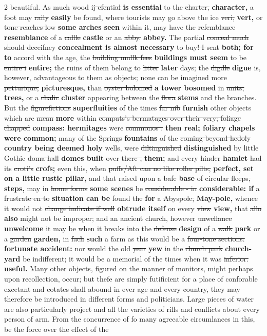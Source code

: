 \documentclass[10pt]{article}
\begin{document}
\begin{multicols}{2}
beautiful. As much wood \sout{ij efential} \textbf{is essential} to the \sout{charter,} \textbf{character,} a foot may \sout{raily} \textbf{easily} be found, where tourists may go above the ice \sout{veri,} \textbf{vert,} or \sout{tone reaches low} \textbf{some arches seen} within it, may have the \sout{refemblance} \textbf{resemblance} of a \sout{callle} \textbf{castle} or an \sout{abby.} \textbf{abbey.} The partial \sout{conceal much should deceifney} \textbf{concealment is almost necessary} to \sout{buy! I sent} \textbf{both; for to} accord with the age, the \sout{building mullk fees} \textbf{buildings must seem} to be \sout{entire i} \textbf{entire;} the ruins of them belong to \sout{litter} \textbf{later} days; the \sout{digdle} \textbf{digue} is, however, advantageous to them as objects; none can be imagined more \sout{petturique,} \textbf{picturesque,} than \sout{oyster bolomed} \textbf{a tower bosomed} in \sout{units,} \textbf{trees,} or a \sout{chalic} \textbf{cluster} appearing between the \sout{flora} \textbf{stems} and the branches. But the \sout{figurefictions} \textbf{superfluities} of the times \sout{far nib} \textbf{furnish} other objects which are \sout{mean} \textbf{more} within \sout{compats’s bermatages over their very; foliage chapped} \textbf{compass: hermitages} were \sout{commonos :} \textbf{then real; foliary chapels were common;} many of the \sout{Springs} \textbf{fountains} of the \sout{coming beyond hedoly} \textbf{country being deemed holy} wells, were \sout{diltinguished} \textbf{distinguished} by little Gothic \sout{doma hall} \textbf{domes built} over \sout{there ,} \textbf{them;} and every \sout{hinder} \textbf{hamlet} had its \sout{croti's} \textbf{crofs;} even this, when \sout{puffs/Aft can no like roller pilts,} \textbf{perfect, set on a little rustic pillar,} and that raised upon a \sout{bafe} \textbf{base} of circular \sout{fleeps,} \textbf{steps,} may in \sout{home forms} \textbf{some scenes} be \sout{considerable - in} \textbf{considerable: if} a \sout{frustrate en to} \textbf{situation can be} found \sout{the} \textbf{for} a \sout{Abyspole,} \textbf{May-pole,} whence it would not \sout{change indicate if well} \textbf{obtrude itself} on every \sout{view} \textbf{view,} that \sout{allo} \textbf{also} might not be improper; and an ancient church, however \sout{unwellance} \textbf{unwelcome} it may be when it breaks into the \sout{defense} \textbf{design} of a \sout{walk} \textbf{park} or a \sout{garden} \textbf{garden,} in \sout{fach} \textbf{such} a farm as this would be a \sout{four-tone sections:} \textbf{fortunate accident:} nor would the old \sout{year} \textbf{yew} in the \sout{church park} \textbf{church-yard} be indifferent; it would be a memorial of the times when it was \sout{inferior.} \textbf{useful.} Many other objects, figured on the manner of monitors, might perhaps upon recollection, occur; but thefe are simply futificient for a place of conforable excetant and cotates shall abound in ever age and every country, they may therefore be introduced in different forms and politicians. Large pieces of water are also particularly project and all the varieties of rills and conflicts about every person of arm. From the concurrence of fo many agreeable circumlances in this, be the force over the effect of the 
\end{multicols}
\end{document}
